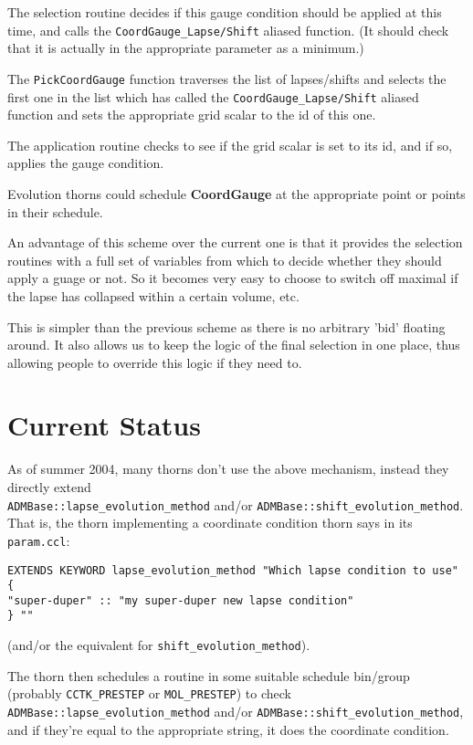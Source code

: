 \documentclass{article}
\begin{document}
The selection routine decides if this gauge condition should be applied at
this time, and calls the \verb|CoordGauge_Lapse/Shift| aliased function.
(It should check that it is actually in the appropriate parameter as a
minimum.)

The \verb|PickCoordGauge| function traverses the list of lapses/shifts
and selects the first one in the list which has called the
\verb|CoordGauge_Lapse/Shift| aliased function and sets the
appropriate grid scalar to the id of this one.

The application routine checks to see if the grid scalar is set to its id,
and if so, applies the gauge condition.

Evolution thorns could schedule {\bf CoordGauge} at the appropriate point or
points in their schedule.

An advantage of this scheme over the current one is that it provides the
selection routines with a full set of variables from which to decide
whether they should apply a guage or not.  So it becomes very easy to
choose to switch off maximal if the lapse has collapsed within a certain
volume, etc.

This is simpler than the previous scheme as there is no arbitrary 'bid'
floating around.  It also allows us to keep the logic of the final
selection in one place, thus allowing people to override this logic if
they need to.


\section{Current Status}

As of summer 2004, many thorns don't use the above mechanism, instead
they directly extend \\
\verb|ADMBase::lapse_evolution_method| and/or
\verb|ADMBase::shift_evolution_method|.  That is, the thorn implementing
a coordinate condition thorn says in its \verb|param.ccl|:
\begin{verbatim}
EXTENDS KEYWORD lapse_evolution_method "Which lapse condition to use"
{
"super-duper" :: "my super-duper new lapse condition"
} ""
\end{verbatim}
(and/or the equivalent for \verb|shift_evolution_method|).

The thorn then schedules a routine in some suitable schedule bin/group
(probably \verb|CCTK_PRESTEP| or \verb|MOL_PRESTEP|) to check
\verb|ADMBase::lapse_evolution_method| and/or
\verb|ADMBase::shift_evolution_method|, and if they're equal
to the appropriate string, it does the coordinate condition.


\end{document}
